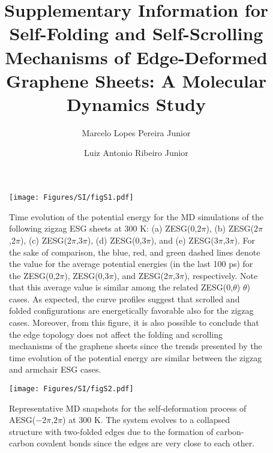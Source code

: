 \documentclass[reprint,superscriptaddress,onecolumn]{revtex4-2}
\begin{document}
\title{Supplementary Information for\\Self-Folding and Self-Scrolling Mechanisms of Edge-Deformed\\Graphene Sheets: A Molecular Dynamics Study}

\author{Marcelo Lopes Pereira Junior}
 \author{Luiz Antonio Ribeiro Junior}
\maketitle

\begin{figure}[!h]
\centering
\texttt{[image: Figures/SI/figS1.pdf]}
\caption{Time evolution of the potential energy for the MD simulations of the following zigzag ESG sheets at 300 K: (a) ZESG(0,2$\pi$), (b) ZESG(2$\pi$,2$\pi$), (c) ZESG(2$\pi$,3$\pi$), (d) ZESG(0,3$\pi$), and (e) ZESG(3$\pi$,3$\pi$). For the sake of comparison, the blue, red, and green dashed lines denote the value for the average potential energies (in the last 100 ps) for the ZESG(0,2$\pi$), ZESG(0,3$\pi$), and ZESG(2$\pi$,3$\pi$), respectively. Note that this average value is similar among the related ZESG(0,$\theta$) $\theta$) cases. As expected, the curve profiles suggest that scrolled and folded configurations are energetically favorable also for the zigzag cases. Moreover, from this figure, it is also possible to conclude that the edge topology does not affect the folding and scrolling mechanisms of the graphene sheets since the trends presented by the time evolution of the potential energy are similar between the zigzag and armchair ESG cases.}
\label{figs1}
\end{figure}

\begin{figure}[!h]
\centering
\texttt{[image: Figures/SI/figS2.pdf]}
\caption{Representative MD snapshots for the self-deformation process of AESG($-2\pi$,$2\pi$) at 300 K. The system evolves to a collapsed structure with two-folded edges due to the formation of carbon-carbon covalent bonds since the edges are very close to each other.}
\label{figs2}
\end{figure}
\end{document}
